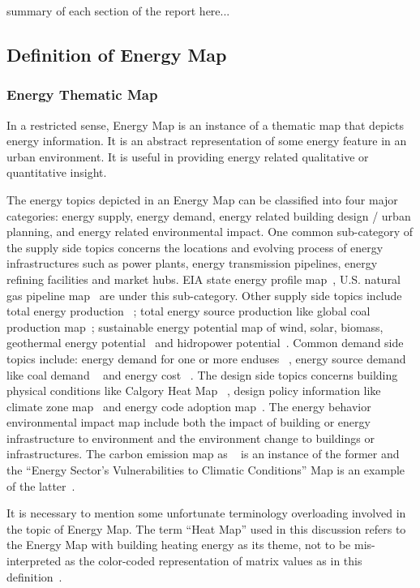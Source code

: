 \documentclass[hidelinks,12pt]{article}
\newcommand{\grey}[1]{\textcolor{black!30}{#1}}
\begin{document}
\grey{summary of each section of the report here...}

\subsection{Definition of Energy Map}
\subsubsection{Energy Thematic Map}
In a restricted sense, Energy Map is an instance of a thematic map
that depicts energy information. It is an abstract representation of
some energy feature in an urban environment. It is useful in providing
energy related qualitative or quantitative insight. 

The energy topics depicted in an Energy Map can be classified into
four major categories: energy supply, energy demand, energy related
building design / urban planning, and energy related environmental
impact. One common sub-category of the supply side topics concerns the
locations and evolving process of energy infrastructures such as power
plants, energy transmission pipelines, energy refining facilities and
market hubs. EIA state energy profile map~\cite{EIAProfile2015},
U.S. natural gas pipeline map~\cite{EIAGaspipe} are under this
sub-category. Other supply side topics include total energy production
~\cite{DOEEnergyProduct}; total energy source production like global
coal production map~\cite{EIACoalProduct}; sustainable energy
potential map of wind, solar, biomass, geothermal energy
potential~\cite{NRELMap2015} and hidropower
potential~\cite{DOEHydro}. Common demand side topics include: energy
demand for one or more enduses ~\cite{heatMap2012}, energy source
demand like coal demand ~\cite{EIACoalDemand} and energy cost
~\cite{DOEEnergyCost}. The design side topics concerns building
physical conditions like Calgory Heat Map ~\cite{Hay2011}, design
policy information like climate zone map~\cite{IECCClimate} and energy
code adoption map~\cite{CodeAdopt}. The energy behavior environmental
impact map include both the impact of building or energy
infrastructure to environment and the environment change to buildings
or infrastructures. The carbon emission map as ~\cite{CO2Atlas} is an
instance of the former and the ``Energy Sector's Vulnerabilities to
Climatic Conditions'' Map is an example of the
latter~\cite{DOEVulner}.

It is necessary to mention some unfortunate terminology overloading
involved in the topic of Energy Map. The term ``Heat Map'' used in
this discussion refers to the Energy Map with building heating energy
as its theme, not to be mis-interpreted as the color-coded
representation of matrix values as in this
definition~\cite{HeatmapWiki}.
\end{document}
